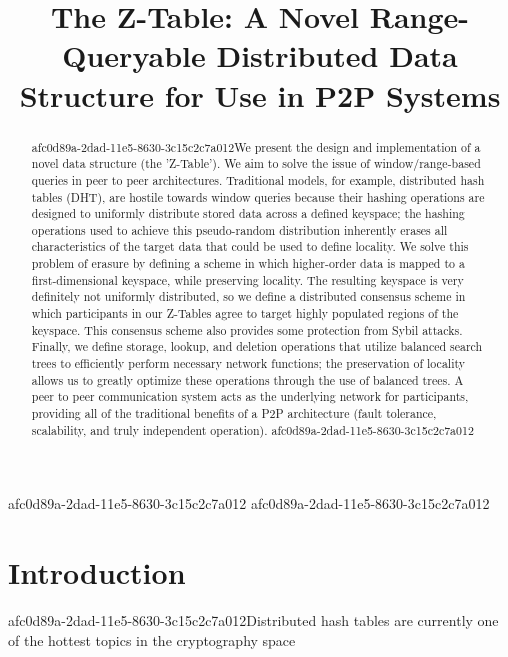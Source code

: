 \documentclass[12pt]{article}
\title{The Z-Table: A Novel Range-Queryable Distributed Data Structure for Use in P2P Systems}
\begin{document}
\maketitle

\begin{abstract}
afc0d89a-2dad-11e5-8630-3c15c2c7a012We present the design and implementation of a novel data structure (the 'Z-Table'). We aim to solve the issue of window/range-based queries in peer to peer architectures. Traditional models, for example,  distributed hash tables (DHT), are hostile towards window queries because their hashing operations are designed to uniformly distribute stored data across a defined keyspace; the hashing operations used to achieve this pseudo-random distribution inherently erases all characteristics of the target data that could be used to define locality. We solve this problem of erasure by defining a scheme in which higher-order data is mapped to a first-dimensional keyspace, while preserving locality. The resulting keyspace is very definitely not uniformly distributed, so we define a distributed consensus scheme in which participants in our Z-Tables agree to target highly populated regions of the keyspace. This consensus scheme also provides some protection from Sybil attacks. Finally, we define storage, lookup, and deletion operations that utilize balanced search trees to efficiently perform necessary network functions; the preservation of locality allows us to greatly optimize these operations through the use of balanced trees. A peer to peer communication system acts as the underlying network for participants, providing all of the traditional benefits of a P2P architecture (fault tolerance, scalability, and truly independent operation).
afc0d89a-2dad-11e5-8630-3c15c2c7a012\end{abstract}
afc0d89a-2dad-11e5-8630-3c15c2c7a012
afc0d89a-2dad-11e5-8630-3c15c2c7a012
\newpage
\section{Introduction}
afc0d89a-2dad-11e5-8630-3c15c2c7a012Distributed hash tables are currently one of the hottest topics in the cryptography space~\cite{Stoica:2001dj,Rowstron:2001ea,Ratnasamy:2001wn}

\printbibliography
\end{document}
